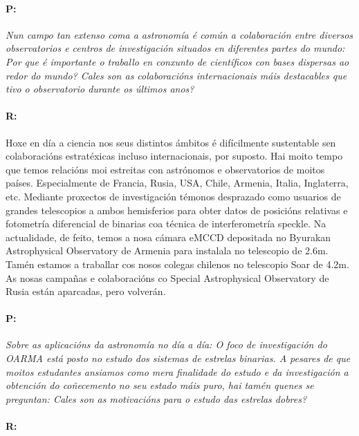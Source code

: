 \begin{multicols}{2}
\paragraph{P:}

\textit{ Nun campo tan extenso coma a astronomía é común a colaboración entre
diversos observatorios e centros de investigación situados en diferentes partes
do mundo: Por que é importante o traballo en conxunto de científicos con bases
dispersas ao redor do mundo? Cales son as colaboracións internacionais máis
destacables que tivo o observatorio durante os últimos anos? }

\paragraph{R:}

Hoxe en día a ciencia nos seus distintos ámbitos é difícilmente sustentable sen
colaboracións estratéxicas incluso internacionais, por suposto. Hai moito tempo
que temos relacións moi estreitas con astrónomos e observatorios de moitos
países. Especialmente de Francia, Rusia, USA, Chile, Armenia, Italia,
Inglaterra, etc. Mediante proxectos de investigación témonos desprazado como
usuarios de grandes telescopios a ambos hemisferios para obter datos de
posicións relativas e fotometría diferencial de binarias coa técnica de
interferometría speckle. Na actualidade, de feito, temos a nosa cámara eMCCD
depositada no Byurakan Astrophysical Observatory de Armenia para instalala no
telescopio de 2.6m. Tamén estamos a traballar cos nosos colegas chilenos no
telescopio Soar de 4.2m. As nosas campañas e colaboracións co Special
Astrophysical Observatory de Rusia están aparcadas, pero volverán.

\paragraph{P:}

\textit{ Sobre as aplicacións da astronomía no día a día: O foco de
investigación do OARMA está posto no estudo dos sistemas de estrelas binarias.
A pesares de que moitos estudantes ansiamos como mera finalidade do estudo e da
investigación a obtención do coñecemento no seu estado máis puro, hai tamén
quenes se preguntan: Cales son as motivacións para o estudo das estrelas
dobres? }

\paragraph{R:}


\end{multicols}
